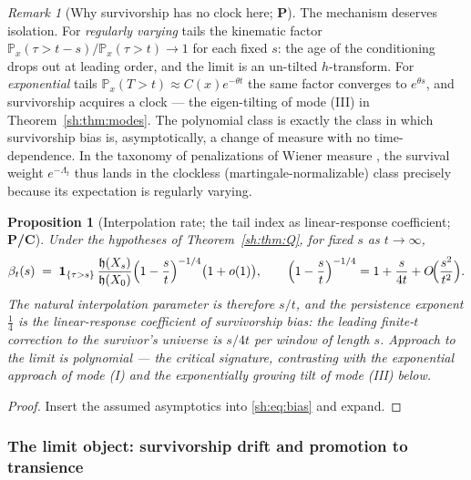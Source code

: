 \documentclass[11pt]{article}
\numberwithin{equation}{section}
\theoremstyle{plain}
\newtheorem{proposition}[theorem]{Proposition}
\theoremstyle{definition}
\theoremstyle{remark}
\newtheorem{remark}[theorem]{Remark}
\newcommand{\PP}{\mathbb{P}}
\newcommand{\one}{\mathbf{1}}
\newcommand{\hm}{\mathfrak{h}}
\begin{document}
\begin{remark}[Why survivorship has no clock here; \textbf{P}]
\label{sh:rem:noclock}
The mechanism deserves isolation. For \emph{regularly varying} tails the
kinematic factor $\PP_x(\tau>t-s)/\PP_x(\tau>t)\to1$ for each fixed $s$:
the age of the conditioning drops out at leading order, and the limit is
an un-tilted $h$-transform. For \emph{exponential} tails
$\PP_x(T>t)\approx C(x)e^{-\theta t}$ the same factor converges to
$e^{\theta s}$, and survivorship acquires a clock --- the eigen-tilting
of mode (III) in Theorem~\ref{sh:thm:modes}. The polynomial class is
exactly the class in which survivorship bias is, asymptotically, a
change of measure with no time-dependence. In the taxonomy of
penalizations of Wiener measure \cite{RVY06}, the survival weight
$e^{-\Lambda_t}$ thus lands in the clockless (martingale-normalizable)
class precisely because its expectation is regularly varying.
\end{remark}

\begin{proposition}[Interpolation rate; the tail index as linear-response
coefficient; \textbf{P/C}]\label{sh:prop:rate}
Under the hypotheses of Theorem~\ref{sh:thm:Q}, for fixed $s$ as
$t\to\infty$,
\begin{equation}\label{sh:eq:rate-interp}
\beta_t(s)\;=\;\one_{\{\tau>s\}}\,\frac{\hm(X_s)}{\hm(X_0)}
\Bigl(1-\frac st\Bigr)^{-1/4}\bigl(1+o(1)\bigr),
\qquad
\Bigl(1-\frac st\Bigr)^{-1/4}=1+\frac{s}{4t}+O\!\Bigl(\frac{s^2}{t^2}\Bigr).
\end{equation}
The natural interpolation parameter is therefore $s/t$, and the
persistence exponent $\tfrac14$ is the linear-response coefficient of
survivorship bias: the leading finite-$t$ correction to the survivor's
universe is $s/4t$ per window of length $s$. Approach to the limit is
polynomial --- the critical signature, contrasting with the exponential
approach of mode (I) and the exponentially growing tilt of mode (III)
below.
\end{proposition}

\begin{proof}
Insert the assumed asymptotics into \eqref{sh:eq:bias} and expand.
\end{proof}

\subsubsection{The limit object: survivorship drift and promotion to
transience}\label{sh:subsub:promotion}
\end{document}
